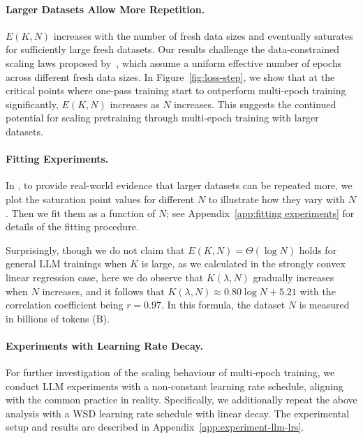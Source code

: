 \paragraph{Larger Datasets Allow More Repetition.}
$E(K,N)$ increases with the number of fresh data sizes and eventually saturates 
for sufficiently large fresh datasets. Our results challenge the data-constrained scaling laws proposed by~\citet{muennighoff2023scaling}, which assume a uniform effective number of epochs across different fresh data sizes. In Figure~\ref{fig:loss-step}, we show that at the critical points where one-pass training start to outperform multi-epoch training significantly, $E(K,N)$ increases as $N$ increases. This suggests the continued potential for scaling pretraining through multi-epoch training with larger datasets.


\paragraph{Fitting Experiments.}In , to provide real-world evidence that larger datasets can be repeated more, we plot the saturation point values for different $N$ to illustrate how they vary with $N$. Then we fit them as a function of $N$; see Appendix~\ref{app:fitting experiments} for details of the fitting procedure. 

Surprisingly, though we do not claim that $E(K,N) = \Theta(\log N)$ holds for general LLM trainings when $K$ is large, as we calculated in the strongly convex linear regression case, here we do observe that $K(\lambda,N)$ gradually increases when $N$ increases, and it follows that $K(\lambda,N) \approx 0.80 \log N + 5.21$ with the correlation coefficient being $r = 0.97$. In this formula, the dataset $N$ is measured in billions of tokens (B).

\paragraph{Experiments with Learning Rate Decay.}For further investigation of the scaling behaviour of multi-epoch training, we conduct LLM experiments with a non-constant learning rate schedule, aligning with the common practice in reality. Specifically, we additionally repeat the above analysis with a WSD learning rate schedule with linear decay. The experimental setup and results are described in Appendix~\ref{app:experiment-llm-lrs}.

